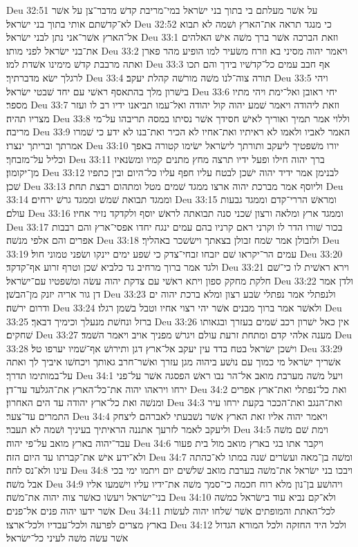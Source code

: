 Deu 32:51  על אשׁר מעלתם בי בתוך בני ישׂראל במי־מריבת קדשׁ מדבר־צן על אשׁר לא־קדשׁתם אותי בתוך בני ישׂראל׃
Deu 32:52  כי מנגד תראה את־הארץ ושׁמה לא תבוא אל־הארץ אשׁר־אני נתן לבני ישׂראל׃
Deu 33:1  וזאת הברכה אשׁר ברך משׁה אישׁ האלהים את־בני ישׂראל לפני מותו׃
Deu 33:2  ויאמר יהוה מסיני בא וזרח משׂעיר למו הופיע מהר פארן ואתה מרבבת קדשׁ מימינו אשׁדת למו׃
Deu 33:3  אף חבב עמים כל־קדשׁיו בידך והם תכו לרגלך ישׂא מדברתיך׃
Deu 33:4  תורה צוה־לנו משׁה מורשׁה קהלת יעקב׃
Deu 33:5  ויהי בישׁרון מלך בהתאסף ראשׁי עם יחד שׁבטי ישׂראל׃
Deu 33:6  יחי ראובן ואל־ימת ויהי מתיו מספר׃
Deu 33:7  וזאת ליהודה ויאמר שׁמע יהוה קול יהודה ואל־עמו תביאנו ידיו רב לו ועזר מצריו תהיה׃
Deu 33:8  וללוי אמר תמיך ואוריך לאישׁ חסידך אשׁר נסיתו במסה תריבהו על־מי מריבה׃
Deu 33:9  האמר לאביו ולאמו לא ראיתיו ואת־אחיו לא הכיר ואת־בנו לא ידע כי שׁמרו אמרתך ובריתך ינצרו׃
Deu 33:10  יורו משׁפטיך ליעקב ותורתך לישׂראל ישׂימו קטורה באפך וכליל על־מזבחך׃
Deu 33:11  ברך יהוה חילו ופעל ידיו תרצה מחץ מתנים קמיו ומשׂנאיו מן־יקומון׃
Deu 33:12  לבנימן אמר ידיד יהוה ישׁכן לבטח עליו חפף עליו כל־היום ובין כתפיו שׁכן׃
Deu 33:13  וליוסף אמר מברכת יהוה ארצו ממגד שׁמים מטל ומתהום רבצת תחת׃
Deu 33:14  וממגד תבואת שׁמשׁ וממגד גרשׁ ירחים׃
Deu 33:15  ומראשׁ הררי־קדם וממגד גבעות עולם׃
Deu 33:16  וממגד ארץ ומלאה ורצון שׁכני סנה תבואתה לראשׁ יוסף ולקדקד נזיר אחיו׃
Deu 33:17  בכור שׁורו הדר לו וקרני ראם קרניו בהם עמים ינגח יחדו אפסי־ארץ והם רבבות אפרים והם אלפי מנשׁה׃
Deu 33:18  ולזבולן אמר שׂמח זבולן בצאתך וישׂשכר באהליך׃
Deu 33:19  עמים הר־יקראו שׁם יזבחו זבחי־צדק כי שׁפע ימים יינקו ושׂפני טמוני חול׃
Deu 33:20  ולגד אמר ברוך מרחיב גד כלביא שׁכן וטרף זרוע אף־קדקד׃
Deu 33:21  וירא ראשׁית לו כי־שׁם חלקת מחקק ספון ויתא ראשׁי עם צדקת יהוה עשׂה ומשׁפטיו עם־ישׂראל׃
Deu 33:22  ולדן אמר דן גור אריה יזנק מן־הבשׁן׃
Deu 33:23  ולנפתלי אמר נפתלי שׂבע רצון ומלא ברכת יהוה ים ודרום ירשׁה׃
Deu 33:24  ולאשׁר אמר ברוך מבנים אשׁר יהי רצוי אחיו וטבל בשׁמן רגלו׃
Deu 33:25  ברזל ונחשׁת מנעלך וכימיך דבאך׃
Deu 33:26  אין כאל ישׁרון רכב שׁמים בעזרך ובגאותו שׁחקים׃
Deu 33:27  מענה אלהי קדם ומתחת זרעת עולם ויגרשׁ מפניך אויב ויאמר השׁמד׃
Deu 33:28  וישׁכן ישׂראל בטח בדד עין יעקב אל־ארץ דגן ותירושׁ אף־שׁמיו יערפו טל׃
Deu 33:29  אשׁריך ישׂראל מי כמוך עם נושׁע ביהוה מגן עזרך ואשׁר־חרב גאותך ויכחשׁו איביך לך ואתה על־במותימו תדרך׃
Deu 34:1  ויעל משׁה מערבת מואב אל־הר נבו ראשׁ הפסגה אשׁר על־פני ירחו ויראהו יהוה את־כל־הארץ את־הגלעד עד־דן׃
Deu 34:2  ואת כל־נפתלי ואת־ארץ אפרים ומנשׁה ואת כל־ארץ יהודה עד הים האחרון׃
Deu 34:3  ואת־הנגב ואת־הככר בקעת ירחו עיר התמרים עד־צער׃
Deu 34:4  ויאמר יהוה אליו זאת הארץ אשׁר נשׁבעתי לאברהם ליצחק וליעקב לאמר לזרעך אתננה הראיתיך בעיניך ושׁמה לא תעבר׃
Deu 34:5  וימת שׁם משׁה עבד־יהוה בארץ מואב על־פי יהוה׃
Deu 34:6  ויקבר אתו בגי בארץ מואב מול בית פעור ולא־ידע אישׁ את־קברתו עד היום הזה׃
Deu 34:7  ומשׁה בן־מאה ועשׂרים שׁנה במתו לא־כהתה עינו ולא־נס לחה׃
Deu 34:8  ויבכו בני ישׂראל את־משׁה בערבת מואב שׁלשׁים יום ויתמו ימי בכי אבל משׁה׃
Deu 34:9  ויהושׁע בן־נון מלא רוח חכמה כי־סמך משׁה את־ידיו עליו וישׁמעו אליו בני־ישׂראל ויעשׂו כאשׁר צוה יהוה את־משׁה׃
Deu 34:10  ולא־קם נביא עוד בישׂראל כמשׁה אשׁר ידעו יהוה פנים אל־פנים׃
Deu 34:11  לכל־האתת והמופתים אשׁר שׁלחו יהוה לעשׂות בארץ מצרים לפרעה ולכל־עבדיו ולכל־ארצו׃
Deu 34:12  ולכל היד החזקה ולכל המורא הגדול אשׁר עשׂה משׁה לעיני כל־ישׂראל׃


